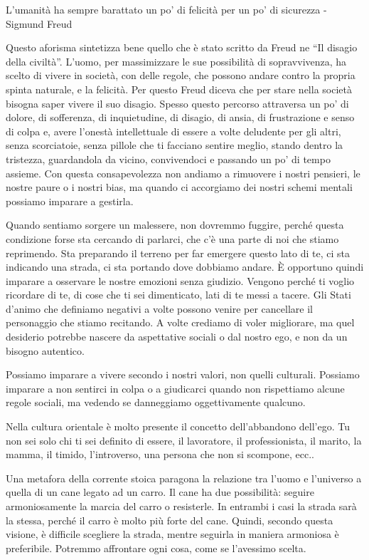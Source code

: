 \documentclass[12pt]{book} %
\begin{document}
L'umanità ha sempre barattato un po' di felicità per un po' di sicurezza - Sigmund Freud

Questo aforisma sintetizza bene quello che è stato scritto da Freud ne “Il disagio della civiltà”.
L'uomo, per massimizzare le sue possibilità di sopravvivenza, ha scelto di vivere in società, con
delle regole, che possono andare contro la propria spinta naturale, e la felicità. 
Per questo Freud diceva che per stare nella società bisogna saper vivere il suo disagio. 
Spesso questo percorso attraversa un po' di dolore, di sofferenza, di inquietudine, di disagio, di ansia, di frustrazione e senso di
colpa e, avere l'onestà intellettuale di essere a volte deludente per gli altri, senza scorciatoie,
senza pillole che ti facciano sentire meglio, stando dentro la tristezza, guardandola da vicino, convivendoci e
passando un po' di tempo assieme. Con questa consapevolezza non andiamo a rimuovere i nostri pensieri, le
nostre paure o i nostri bias, ma quando ci accorgiamo dei nostri schemi mentali possiamo imparare a gestirla.

Quando sentiamo sorgere un malessere, non dovremmo fuggire, perché questa condizione forse sta cercando di
parlarci, che c'è una parte di noi che stiamo reprimendo. Sta preparando il terreno per far emergere
questo lato di te, ci sta indicando una strada, ci sta portando dove dobbiamo andare. È opportuno quindi imparare a osservare le nostre emozioni senza giudizio. Vengono perché ti voglio ricordare di te, di cose che ti sei
dimenticato, lati di te messi a tacere. Gli Stati d'animo che definiamo negativi a volte possono venire per cancellare il personaggio
che stiamo recitando. A volte crediamo di voler migliorare, ma quel desiderio potrebbe nascere da aspettative sociali o dal nostro ego, e non da un bisogno autentico.

Possiamo imparare a vivere secondo i nostri valori, non
quelli culturali. Possiamo imparare a non sentirci in colpa o a giudicarci quando non rispettiamo alcune regole
sociali, ma vedendo se danneggiamo oggettivamente qualcuno. 

Nella cultura orientale è molto presente il concetto dell'abbandono dell'ego.
Tu non sei solo chi ti sei definito di essere, il lavoratore, il professionista, il marito, la mamma, il timido,
l'introverso, una persona che non si scompone, ecc.. 

Una metafora della corrente stoica paragona la relazione tra
l'uomo e l'universo a quella di un cane legato ad un carro. Il cane ha due
possibilità: seguire armoniosamente la marcia del carro o resisterle. In entrambi i casi la strada sarà la stessa,
perché il carro è molto più forte del cane. Quindi, secondo questa visione, è difficile scegliere la strada, mentre seguirla in maniera
armoniosa è preferibile. Potremmo affrontare ogni cosa, come se l'avessimo scelta.
\end{document}
